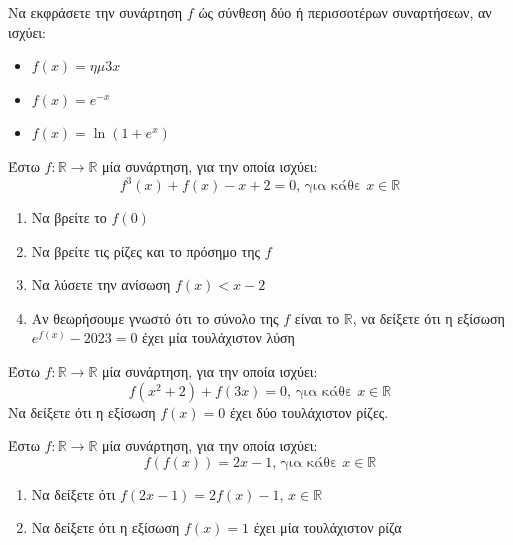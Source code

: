 \documentclass{presentation}
\begin{document}
\begin{askisi}
  Να εκφράσετε την συνάρτηση $f$ ώς σύνθεση δύο ή περισσοτέρων συναρτήσεων, αν ισχύει:
  \begin{itemize}
    \item $f(x)=ημ 3x$
    \item $f(x)=e^{-x}$
    \item $f(x)=\ln (1+e^x)$
  \end{itemize}

\end{askisi}

\begin{askisi}
  Έστω $f:\mathbb{R}\to\mathbb{R}$ μία συνάρτηση, για την οποία ισχύει:
  $$f^3(x)+f(x)-x+2=0\text{, για κάθε } x\in\mathbb{R}$$
  \begin{enumerate}
    \item<1-> Να βρείτε το $f(0)$
    \item<2-> Να βρείτε τις ρίζες και το πρόσημο της $f$
    \item<3-> Να λύσετε την ανίσωση $f(x)<x-2$
    \item<4-> Αν θεωρήσουμε γνωστό ότι το σύνολο της $f$ είναι το $\mathbb{R}$, να δείξετε ότι η εξίσωση $e^{f(x)}-2023=0$ έχει μία τουλάχιστον λύση
  \end{enumerate}

\end{askisi}

\begin{askisi}
  Έστω $f:\mathbb{R}\to\mathbb{R}$ μία συνάρτηση, για την οποία ισχύει:
  $$f(x^2+2)+f(3x)=0 \text{, για κάθε } x\in\mathbb{R}$$
  Να δείξετε ότι η εξίσωση $f(x)=0$ έχει δύο τουλάχιστον ρίζες.

\end{askisi}

\begin{askisi}
  Έστω $f:\mathbb{R}\to\mathbb{R}$ μία συνάρτηση, για την οποία ισχύει:
  $$f\left(f(x)\right)=2x-1\text{, για κάθε } x\in\mathbb{R}$$
  \begin{enumerate}
    \item<1-> Να δείξετε ότι $f(2x-1)=2f(x)-1$, $x\in\mathbb{R}$
    \item<2-> Να δείξετε ότι η εξίσωση $f(x)=1$ έχει μία τουλάχιστον ρίζα
  \end{enumerate}

\end{askisi}
\end{document}
